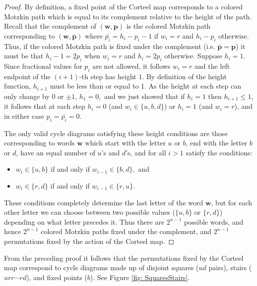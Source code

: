 \documentclass{amsart}
\theoremstyle{definition}
\begin{document}
\begin{proof}
  By definition, a fixed point of the Corteel map corresponds to a colored Motzkin path which is equal to its complement relative to the height of the path.
  Recall that the complement of $(\mathbf{w},\mathbf{p})$ is the colored Motzkin path corresponding to $(\mathbf{w},\mathbf{\bar{p}})$ where $\bar{p_i}=h_i-p_i-1$ if $w_i=r$ and $h_i-p_i$ otherwise.
  Thus, if the colored Motzkin path is fixed under the complement (i.e. $\mathbf{\bar{p}}=\mathbf{p}$) it must be that $h_i-1=2p_i$ when $w_i=r$ and $h_i=2p_i$ otherwise.  Suppose $h_i=1.$  Since fractional values for $p_i$ are not allowed, it follows $w_i=r$ and the left endpoint of the $(i+1)$-th step has height $1.$  By definition of the height function, $h_{i+1}$ must be less than or equal to 1.  As the height at each step can only change by $0$ or $\pm 1$, $h_1=0,$ and we just showed that if $h_i=1$ then $h_{i+1}\leq 1$, it follows that at each step $h_i=0$ (and $w_i\in \{u,b,d\}$) or $h_i=1$ (and $w_i=r$), and in either case $p_i=\bar{p_i}=0.$

  The only valid cycle diagrams satisfying these height conditions are those corresponding to words $\mathbf{w}$ which start with the letter $u$ or $b$, end with the letter $b$ or $d$, have an equal number of $u$'s and $d$'s, and for all $i>1$ satisfy the conditions:
  \begin{itemize}
    \item $w_i\in \{u,b\}$ if and only if $w_{i-1}\in\{b,d\},$ and
    \item $w_i\in\{r,d\}$ if and only if $w_{i-1}\in\{r,u\}.$
  \end{itemize}
  These conditions completely determine the last letter of the word $\mathbf{w}$, but for each other letter we can choose between two possible values ($\{u,b\}$ or $\{r,d\}$) depending on what letter precedes it.  Thus there are $2^{n-1}$ possible words, and hence $2^{n-1}$ colored Motzkin paths fixed under the complement, and $2^{n-1}$ permutations fixed by the action of the Corteel map.
\end{proof}

% 
From the preceding proof it follows that the permutations fixed by the Corteel map correspond to cycle diagrams made up of disjoint squares ($ud$ pairs), stairs ($urr\cdots rd$), and fixed points ($b$).  See Figure \ref{fig: SquaresStairs}.
\end{document}
